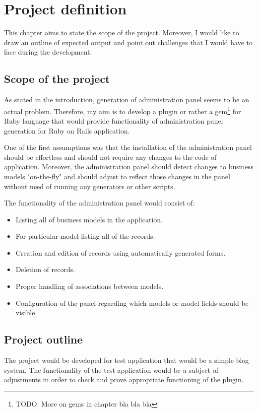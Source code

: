
\chapter{Project definition}
  This chapter aims to state the scope of the project. Moreover, I would like to draw an outline of expected output and point out challenges that I would have to face during the development.
  
  \section{Scope of the project}
  As stated in the introduction, generation of administration panel seems to be an actual problem. Therefore, my aim is to develop a plugin or rather a gem\footnote{TODO: More on gems in chapter bla bla bla} for Ruby language that would provide functionality of administration panel generation for Ruby on Rails application. 
  
  One of the first assumptions was that the installation of the administration panel should be effortless and should not require any changes to the code of application. Moreover, the administration panel should detect changes to business models "on-the-fly" and should adjust to reflect those changes in the panel without need of running any generators or other scripts.
  
  The functionality of the administration panel would consist of:
  \begin{itemize}
	  \item Listing all of business models in the application.
	  \item For particular model listing all of the records.
	  \item Creation and edition of records using automatically generated forms.
	  \item Deletion of records.
	  \item Proper handling of associations between models.
	  \item Configuration of the panel regarding which models or model fields should be visible.
	\end{itemize}
	
	\section{Project outline}
	The project would be developed for test application that would be a simple blog system. The functionality of the test application would be a subject of adjustments in order to check and prove appropriate functioning of the plugin. 
	
